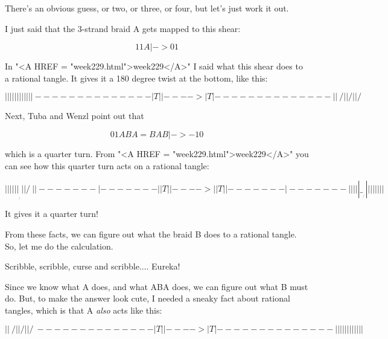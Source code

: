 There's an obvious guess, or two, or three, or four, but let's just
work it out.

I just said that the 3-strand braid A gets mapped to this shear:


$$

        1   1
A |->  
        0   1
$$
    
In "<A HREF = "week229.html">week229</A>" I said what this
shear does to a rational tangle.  It gives it a 180 degree twist at
the bottom, like this:


$$

  |   |                |   |
  |   |                |   |
  |   |                |   |
 -------              -------
 |  T  |   |---->     |  T  |        
 -------              -------
  |   |                 \ /
  |   |                  / 
  |   |                 / \
$$
    
Next, Tuba and Wenzl point out that


$$

                  0   1
ABA = BAB |-> 
                 -1   0
$$
    

which is a quarter turn.  From "<A HREF =
"week229.html">week229</A>" you can see how this quarter turn
acts on a rational tangle:


$$

  |   |                       |     | 
  |   |              ____     |     |
  |   |             /     \   |     |
 -------           |     -------    |
 |  T  |   |---->  |     |  T  |    |    
 -------           |     -------    |
  |   |            |      |   \____/
  |   |            |      |    
  |   |            |      |  
$$
    
It gives it a quarter turn!      

From these facts, we can figure out what the braid B does to a 
rational tangle.  So, let me do the calculation.  

Scribble, scribble, curse and scribble.... Eureka!

Since we know what A does, and what ABA does, we can figure out 
what B must do.  But, to make the answer look cute, I needed a 
sneaky fact about rational tangles, which is that A \emph{also} acts 
like this:


$$

  |   |                 \ / 
  |   |                  /
  |   |                 / \ 
 -------              -------
 |  T  |   |---->     |  T  |        
 -------              -------
  |   |                |   |
  |   |                |   | 
  |   |                |   |
$$
    
